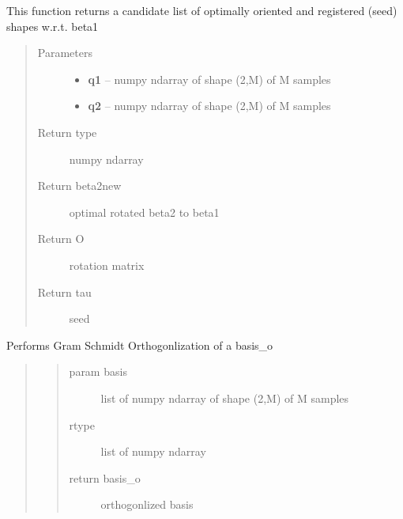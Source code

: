 \documentclass[letterpaper,10pt,english]{sphinxmanual}
\begin{document}
\begin{fulllineitems}
\label{curve_functions:curve_functions.find_rotation_and_seed_q}
This function returns a candidate list of optimally oriented and
registered (seed) shapes w.r.t. beta1
\begin{quote}\begin{description}
\item[{Parameters}] \leavevmode\begin{itemize}
\item {} 
\textbf{q1} -- numpy ndarray of shape (2,M) of M samples

\item {} 
\textbf{q2} -- numpy ndarray of shape (2,M) of M samples

\end{itemize}

\item[{Return type}] \leavevmode
numpy ndarray

\item[{Return beta2new}] \leavevmode
optimal rotated beta2 to beta1

\item[{Return O}] \leavevmode
rotation matrix

\item[{Return tau}] \leavevmode
seed

\end{description}\end{quote}

\end{fulllineitems}


\begin{fulllineitems}
\label{curve_functions:curve_functions.gram_schmidt}
Performs Gram Schmidt Orthogonlization of a basis\_o
\begin{quote}
\begin{quote}\begin{description}
\item[{param basis}] \leavevmode
list of numpy ndarray of shape (2,M) of M samples

\item[{rtype}] \leavevmode
list of numpy ndarray

\item[{return basis\_o}] \leavevmode
orthogonlized basis

\end{description}\end{quote}
\end{quote}

\end{fulllineitems}
\end{document}
